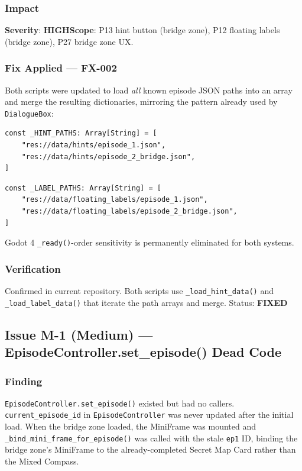 \documentclass[12pt, a4paper]{article}
\newcommand{\sevHigh}{\textcolor{highoran}{\textbf{HIGH}}}
\newcommand{\sevFixed}{\textcolor{passgre}{\textbf{FIXED}}}
\begin{document}
\subsubsection*{Impact}

\textbf{Severity}: \sevHigh\quad\textbf{Scope}: P13 hint button (bridge zone), P12 floating labels (bridge zone), P27 bridge zone UX.

\subsubsection*{Fix Applied — FX-002}

Both scripts were updated to load \textit{all} known episode JSON paths into
an array and merge the resulting dictionaries, mirroring the pattern already
used by \texttt{DialogueBox}:

\begin{lstlisting}
const _HINT_PATHS: Array[String] = [
    "res://data/hints/episode_1.json",
    "res://data/hints/episode_2_bridge.json",
]
\end{lstlisting}

\begin{lstlisting}
const _LABEL_PATHS: Array[String] = [
    "res://data/floating_labels/episode_1.json",
    "res://data/floating_labels/episode_2_bridge.json",
]
\end{lstlisting}

Godot 4 \texttt{\_ready()}-order sensitivity is permanently eliminated for
both systems.

\subsubsection*{Verification}

Confirmed in current repository. Both scripts use \texttt{\_load\_hint\_data()}
and \texttt{\_load\_label\_data()} that iterate the path arrays and merge.
Status: \sevFixed

\subsection{Issue M-1 (Medium) — EpisodeController.set\_episode() Dead Code}

\subsubsection*{Finding}

\texttt{EpisodeController.set\_episode()} existed but had no callers.
\texttt{current\_episode\_id} in \texttt{EpisodeController} was never updated
after the initial load. When the bridge zone loaded, the MiniFrame was mounted
and \texttt{\_bind\_mini\_frame\_for\_episode()} was called with the stale
\texttt{ep1} ID, binding the bridge zone's MiniFrame to the already-completed
Secret Map Card rather than the Mixed Compass.
\end{document}
